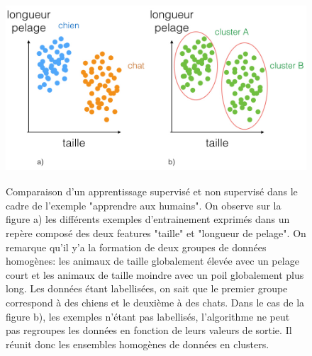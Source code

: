 \begin{figure}[h]
	\centering\includegraphics[height=7cm]{images/apprentissage_chat.jpeg}
	\caption[Comparaison d'un apprentissage supervisé et non supervisé dans le cadre de l'exemple "apprendre aux humains"]{Comparaison d'un apprentissage supervisé et non supervisé dans le cadre de l'exemple "apprendre aux humains". On observe sur la figure a) les différents exemples d'entrainement exprimés dans un repère composé des deux features "taille" et "longueur de pelage". On remarque qu'il y'a la formation de deux groupes de données homogènes: les animaux de taille globalement élevée avec un pelage court et les animaux de taille moindre avec un poil globalement plus long. Les données étant labellisées, on sait que le premier groupe correspond à des chiens et le deuxième à des chats. Dans le cas de la figure b), les exemples n'étant pas labellisés, l'algorithme ne peut pas regroupes les données en fonction de leurs valeurs de sortie. Il réunit donc les ensembles homogènes de données en clusters.}
	\label{fig:Comparaison d'un apprentissage supervisé et non supervisé dans le cadre de l'exemple "apprendre aux humains"}
\end{figure}

